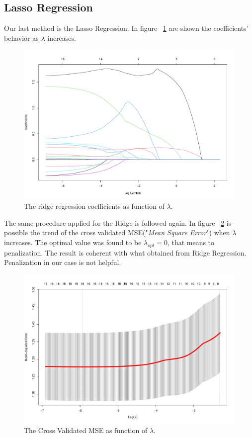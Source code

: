 \subsection{Lasso Regression}

Our last method is the Lasso Regression. In figure \Fig~\ref{fig:LassoCoefVsLambda} are shown the coefficients' behavior as $\lambda$ increases. 

\begin{figure}[h]
	\centering
	\includegraphics[width=0.5\linewidth]{ImageFiles/Regression/Lasso/LassoCoefVsLambda}
	\caption{The ridge regression coefficients as function of $\lambda$.}
	\label{fig:LassoCoefVsLambda}
\end{figure}

The same procedure applied for the Ridge is followed again. In figure \Fig~\ref{fig:LassoCvPlot} is possible the trend of the cross validated MSE("\textit{Mean Square Error}") when $\lambda$ increases. The optimal value was found to be $\lambda_{opt} = 0$, that means to penalization. The result is coherent with what obtained from Ridge Regression. Penalization in our case is not helpful.

\begin{figure}[h]
	\centering
	\includegraphics[width=0.7\linewidth]{ImageFiles/Regression/Lasso/LassoCvPlot}
	\caption{The Cross Validated MSE as function of $\lambda$.}
	\label{fig:LassoCvPlot}
\end{figure}